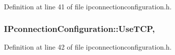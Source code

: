 Definition at line 41 of file ipconnectionconfiguration.\-h.

\hypertarget{group___i_p_conn_plugin_ga40b7a131ca4ee4e1c315a0fc12281da8}{
\subsubsection[{Use\-T\-C\-P}]{ I\-Pconnection\-Configuration\-::\-Use\-T\-C\-P\hspace{0.3cm}{\ttfamily [read]}, {\ttfamily [write]}}}\label{group___i_p_conn_plugin_ga40b7a131ca4ee4e1c315a0fc12281da8}


Definition at line 42 of file ipconnectionconfiguration.\-h.

